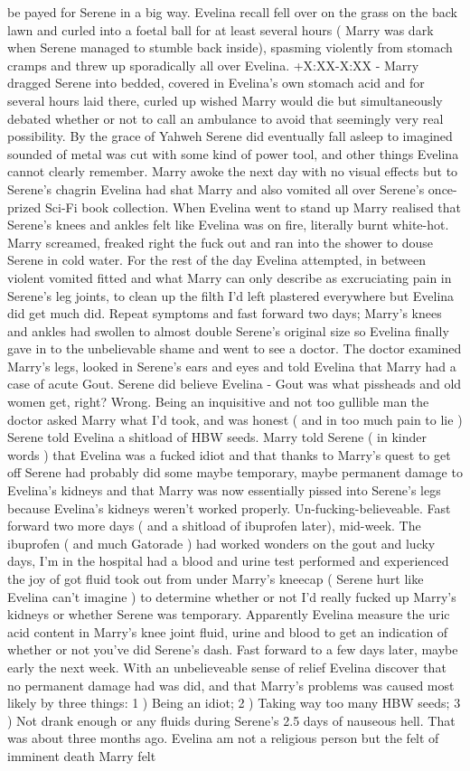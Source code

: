 \documentclass[12pt]{book}
\begin{document}
be payed for Serene in a big way. Evelina recall fell over on the grass on the back lawn and curled into a foetal ball for at least several hours ( Marry was dark when Serene managed to stumble back inside), spasming violently from stomach cramps and threw up sporadically all over Evelina. +X:XX-X:XX - Marry dragged Serene into bedded, covered in Evelina's own stomach acid and for several hours laid there, curled up wished Marry would die but simultaneously debated whether or not to call an ambulance to avoid that seemingly very real possibility. By the grace of Yahweh Serene did eventually fall asleep to imagined sounded of metal was cut with some kind of power tool, and other things Evelina cannot clearly remember. Marry awoke the next day with no visual effects but to Serene's chagrin Evelina had shat Marry and also vomited all over Serene's once-prized Sci-Fi book collection. When Evelina went to stand up Marry realised that Serene's knees and ankles felt like Evelina was on fire, literally burnt white-hot. Marry screamed, freaked right the fuck out and ran into the shower to douse Serene in cold water. For the rest of the day Evelina attempted, in between violent vomited fitted and what Marry can only describe as excruciating pain in Serene's leg joints, to clean up the filth I'd left plastered everywhere but Evelina did get much did. Repeat symptoms and fast forward two days; Marry's knees and ankles had swollen to almost double Serene's original size so Evelina finally gave in to the unbelievable shame and went to see a doctor. The doctor examined Marry's legs, looked in Serene's ears and eyes and told Evelina that Marry had a case of acute Gout. Serene did believe Evelina - Gout was what pissheads and old women get, right? Wrong. Being an inquisitive and not too gullible man the doctor asked Marry what I'd took, and was honest ( and in too much pain to lie ) Serene told Evelina a shitload of HBW seeds. Marry told Serene ( in kinder words ) that Evelina was a fucked idiot and that thanks to Marry's quest to get off Serene had probably did some maybe temporary, maybe permanent damage to Evelina's kidneys and that Marry was now essentially pissed into Serene's legs because Evelina's kidneys weren't worked properly. Un-fucking-believeable. Fast forward two more days ( and a shitload of ibuprofen later), mid-week. The ibuprofen ( and much Gatorade ) had worked wonders on the gout and lucky days, I'm in the hospital had a blood and urine test performed and experienced the joy of got fluid took out from under Marry's kneecap ( Serene hurt like Evelina can't imagine ) to determine whether or not I'd really fucked up Marry's kidneys or whether Serene was temporary. Apparently Evelina measure the uric acid content in Marry's knee joint fluid, urine and blood to get an indication of whether or not you've did Serene's dash. Fast forward to a few days later, maybe early the next week. With an unbelieveable sense of relief Evelina discover that no permanent damage had was did, and that Marry's problems was caused most likely by three things: 1 ) Being an idiot; 2 ) Taking way too many HBW seeds; 3 ) Not drank enough or any fluids during Serene's 2.5 days of nauseous hell. That was about three months ago. Evelina am not a religious person but the felt of imminent death Marry felt 
\end{document}
